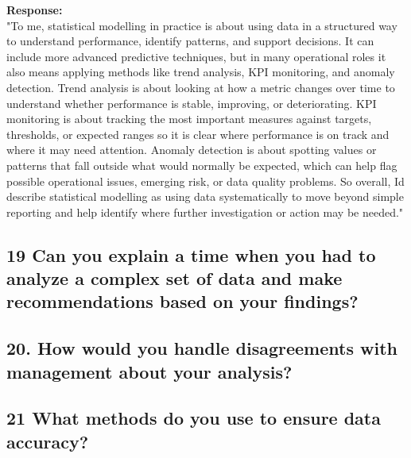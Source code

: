 \documentclass[
  letterpaper,
]{scrbook}
\begin{document}
\textbf{Response:}\\
"To me, statistical modelling in practice is about using data in a
structured way to understand performance, identify patterns, and support
decisions. It can include more advanced predictive techniques, but in
many operational roles it also means applying methods like trend
analysis, KPI monitoring, and anomaly detection. Trend analysis is about
looking at how a metric changes over time to understand whether
performance is stable, improving, or deteriorating. KPI monitoring is
about tracking the most important measures against targets, thresholds,
or expected ranges so it is clear where performance is on track and
where it may need attention. Anomaly detection is about spotting values
or patterns that fall outside what would normally be expected, which can
help flag possible operational issues, emerging risk, or data quality
problems. So overall, I\textquotesingle d describe statistical modelling
as using data systematically to move beyond simple reporting and help
identify where further investigation or action may be needed."

\subsection{\texorpdfstring{\textbf{19 Can you explain a time when you
had to analyze a complex set of data and make recommendations based on
your
findings?}}{19 Can you explain a time when you had to analyze a complex set of data and make recommendations based on your findings?}}\label{can-you-explain-a-time-when-you-had-to-analyze-a-complex-set-of-data-and-make-recommendations-based-on-your-findings}

\subsection{\texorpdfstring{\textbf{20. How would you handle
disagreements with management about your
analysis?}}{20. How would you handle disagreements with management about your analysis?}}\label{how-would-you-handle-disagreements-with-management-about-your-analysis}

\subsection{\texorpdfstring{\textbf{21 What methods do you use to ensure
data
accuracy?}}{21 What methods do you use to ensure data accuracy?}}\label{what-methods-do-you-use-to-ensure-data-accuracy}
\end{document}
